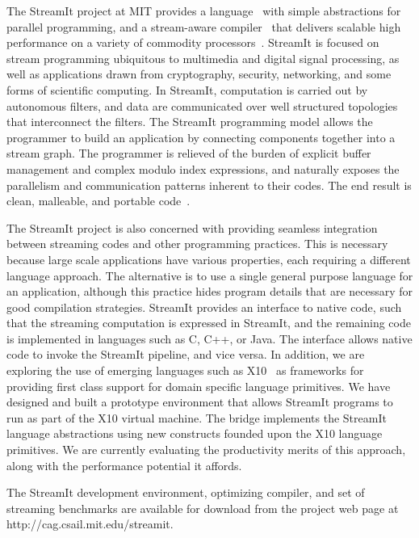 The StreamIt project at MIT provides a language~\cite{streamitcc} with
simple abstractions for parallel programming, and a stream-aware
compiler~\cite{agrawal05cases,gordon02asplos,lamb03pldi,sermulins05lctes}
that delivers scalable high performance on a variety of commodity
processors~\cite{gordon02asplos, raw04isca}. StreamIt is focused on
stream programming ubiquitous to multimedia and digital signal
processing, as well as applications drawn from cryptography, security,
networking, and some forms of scientific computing. In StreamIt,
computation is carried out by autonomous filters, and data are
communicated over well structured topologies that interconnect the
filters. The StreamIt programming model allows the programmer to build
an application by connecting components together into a stream
graph. The programmer is relieved of the burden of explicit buffer
management and complex modulo index expressions, and naturally exposes
the parallelism and communication patterns inherent to their codes.
The end result is clean, malleable, and portable
code~\cite{drake06ipdps}.

The StreamIt project is also concerned with providing seamless
integration between streaming codes and other programming
practices. This is necessary because large scale applications have
various properties, each requiring a different language approach. The
alternative is to use a single general purpose language for an
application, although this practice hides program details that are
necessary for good compilation strategies. StreamIt provides an
interface to native code, such that the streaming computation is
expressed in StreamIt, and the remaining code is implemented in
languages such as C, C++, or Java. The interface allows native code to
invoke the StreamIt pipeline, and vice versa.  In addition, we are
exploring the use of emerging languages such as X10~\cite{x10} as
frameworks for providing first class support for domain specific
language primitives. We have designed and built a prototype
environment that allows StreamIt programs to run as part of the X10
virtual machine. The bridge implements the StreamIt language
abstractions using new constructs founded upon the X10 language
primitives. We are currently evaluating the productivity merits of
this approach, along with the performance potential it affords.

The StreamIt development environment, optimizing compiler, and set of
streaming benchmarks are available for download from the project
web page at http://cag.csail.mit.edu/streamit.
